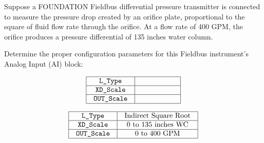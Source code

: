 

Suppose a FOUNDATION Fieldbus differential pressure transmitter is connected to measure the pressure drop created by an orifice plate, proportional to the square of fluid flow rate through the orifice.  At a flow rate of 400 GPM, the orifice produces a pressure differential of 135 inches water column.

\vskip 10pt

Determine the proper configuration parameters for this Fieldbus instrument's Analog Input (AI) block:


$$\vbox{\offinterlineskip
\halign{\strut
\vrule \quad\hfil # \ \hfil & 
\vrule \quad\hfil # \ \hfil \vrule \cr
\noalign{\hrule}
%
{\tt L\_Type} & \hskip 50pt \cr
%
\noalign{\hrule}
%
{\tt XD\_Scale} & \hskip 50pt \cr
%
\noalign{\hrule}
%
{\tt OUT\_Scale} & \hskip 50pt \cr
%
\noalign{\hrule}
} %
}$$ %








$$\vbox{\offinterlineskip
\halign{\strut
\vrule \quad\hfil # \ \hfil & 
\vrule \quad\hfil # \ \hfil \vrule \cr
\noalign{\hrule}
%
{\tt L\_Type} & Indirect Square Root \cr
%
\noalign{\hrule}
%
{\tt XD\_Scale} & 0 to 135 inches WC \cr
%
\noalign{\hrule}
%
{\tt OUT\_Scale} & 0 to 400 GPM \cr
%
\noalign{\hrule}
} %
}$$ %












